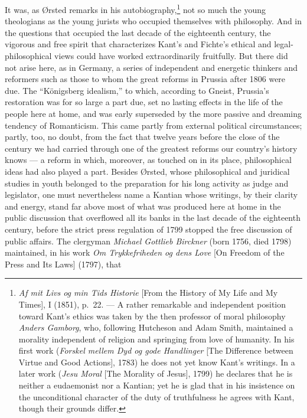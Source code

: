 \documentclass[12pt,a4paper]{book}
\newcommand{\opage}[1]{\marginnote{\footnotesize\textit{[#1]}}}
\begin{document}
It was, as Ørsted remarks in his autobiography,\footnote{\emph{Af mit Livs og min
Tids Historie} [From the History of My Life and My Times], I (1851), p.~22. --- A
rather remarkable and independent position toward Kant's ethics was taken by the
then professor of moral philosophy \emph{Anders Gamborg}, who, following Hutcheson and
Adam Smith, maintained a morality independent of religion and springing from love
of humanity. In his first work (\emph{Forskel mellem Dyd og gode Handlinger} [The
Difference between Virtue and Good Actions], 1783) he does not yet know Kant's
writings. In a later work (\emph{Jesu Moral} [The Morality of Jesus], 1799) he
declares that he is neither a eudaemonist nor a Kantian; yet he is glad that in his
insistence on the unconditional character of the duty of truthfulness he agrees
with Kant, though their grounds differ.} not so much the young theologians as the
young jurists who occupied themselves with philosophy. And in the questions that
\opage{28}occupied the last decade of the eighteenth century, the vigorous and free spirit
that characterizes Kant's and Fichte's ethical and legal-philosophical views could
have worked extraordinarily fruitfully. But there did not arise here, as in
Germany, a series of independent and energetic thinkers and reformers such as those
to whom the great reforms in Prussia after 1806 were due. The ``Königsberg
idealism,'' to which, according to Gneist, Prussia's restoration was for so large a
part due, set no lasting effects in the life of the people here at home, and was
early superseded by the more passive and dreaming tendency of Romanticism. This
came partly from external political circumstances; partly, too, no doubt, from the
fact that twelve years before the close of the century we had carried through one
of the greatest reforms our country's history knows --- a reform in which,
moreover, as touched on in its place, philosophical ideas had also played a part.
Besides Ørsted, whose philosophical and juridical studies in youth belonged to the
preparation for his long activity as judge and legislator, one must nevertheless
name a Kantian whose writings, by their clarity and energy, stand far above most
of what was produced here at home in the public discussion that overflowed all its
banks in the last decade of the eighteenth century, before the strict press
regulation of 1799 stopped the free discussion of public affairs. The clergyman
\emph{Michael Gottlieb Birckner} (born 1756, died 1798) maintained, in his work \emph{Om
Trykkefriheden og dens Love} [On Freedom of the Press and Its Laws] (1797), that
\end{document}
